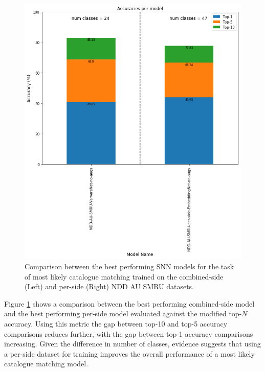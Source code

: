 \begin{figure}
	\begin{center}
		\includegraphics[scale=0.4]{Chapter5/figs/NDDAUSMRU-combined-and-per-side-comparison.png}
	\end{center}
	\caption{Comparison between the best performing SNN models for the task of most likely catalogue matching trained on the combined-side (Left) and per-side (Right) NDD AU SMRU datasets.}
	\label{fig:NDDAUSMRU-combined-and-per-side-comparison-individual-classification-only}
\end{figure}

Figure \ref{fig:NDDAUSMRU-combined-and-per-side-comparison-individual-classification-only} shows a comparison between the best performing combined-side model and the best performing per-side model evaluated against the modified top-$N$ accuracy. Using this metric the gap between top-10 and top-5 accuracy comparisons reduces further, with the gap between top-1 accuracy comparisons increasing. Given the difference in number of classes, evidence suggests that using a per-side dataset for training improves the overall performance of a most likely catalogue matching model. 

